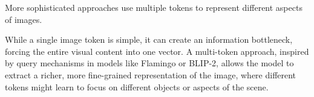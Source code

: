 More sophisticated approaches use multiple tokens to represent different aspects of images.

While a single image token is simple, it can create an information bottleneck, forcing the entire visual content into one vector. A multi-token approach, inspired by query mechanisms in models like Flamingo or BLIP-2, allows the model to extract a richer, more fine-grained representation of the image, where different tokens might learn to focus on different objects or aspects of the scene.

\begin{comment}
Feedback: Before the code, it's helpful to explain the motivation for this more complex approach. For example: "While a single image token is simple, it can create an information bottleneck, forcing the entire visual content into one vector. A multi-token approach, inspired by query mechanisms in models like Flamingo or BLIP-2, allows the model to extract a richer, more fine-grained representation of the image, where different tokens might learn to focus on different objects or aspects of the scene."

STATUS: addressed - added explanation of motivation for multi-token approach and information bottleneck problem
\end{comment}

